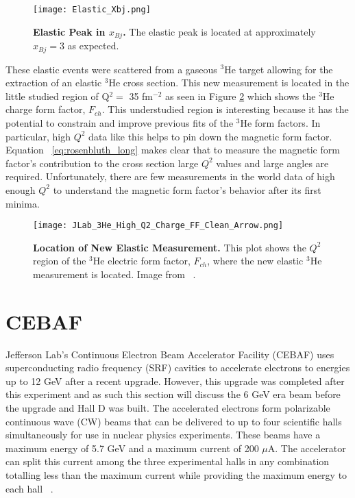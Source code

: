 \begin{figure}[!ht]
\begin{center}
\texttt{[image: Elastic\_Xbj.png]}
\end{center}
\caption[Elastic Peak in $x_{Bj}$]{
{\bf{Elastic Peak in $x_{Bj}$.}} The elastic peak is located at approximately $x_{Bj}=3$ as expected.}
\label{fig:elastic_xbj}
\end{figure}

These elastic events were scattered from a gaseous $^3$He target allowing for the extraction of an elastic $^3$He cross section. This new measurement is located in the little studied region of Q$^2 = $ 35 fm$^{-2}$ as seen in Figure \ref{fig:jlab_3he} which shows the $^3$He charge form factor, $F_{ch}$. This understudied region is interesting because it has the potential to constrain and improve previous fits of the $^3$He form factors. In particular, high $Q^2$ data like this helps to pin down the magnetic form factor. Equation ~\ref{eq:rosenbluth_long} makes clear that to measure the magnetic form factor's contribution to the cross section large $Q^2$ values and large angles are required. Unfortunately, there are few measurements in the world data of high enough $Q^2$ to understand the magnetic form factor's behavior after its first minima. 

\begin{figure}[!ht]
\begin{center}
\texttt{[image: JLab\_3He\_High\_Q2\_Charge\_FF\_Clean\_Arrow.png]}
\end{center}
\caption[Location of New Elastic Measurement]{
{\bf{Location of New Elastic Measurement.}} This plot shows the $Q^2$ region of the $^3$He electric form factor, $F_{ch}$, where the new elastic $^3$He measurement is located. Image from ~\cite{Article:Alex}.}
\label{fig:jlab_3he}
\end{figure}

\section{CEBAF}
\label{sec:CEBAF}

Jefferson Lab's Continuous Electron Beam Accelerator Facility (CEBAF) uses superconducting radio frequency (SRF) cavities to accelerate electrons to energies up to 12 GeV after a recent upgrade. However, this upgrade was completed after this experiment and as such this section will discuss the 6 GeV era beam before the upgrade and Hall D was built. The accelerated electrons form polarizable continuous wave (CW) beams that can be delivered to up to four scientific halls simultaneously for use in nuclear physics experiments. These beams have a maximum energy of 5.7 GeV and a maximum current of 200 $\mu$A. The accelerator can split this current among the three experimental halls in any combination totalling less than the maximum current while providing the maximum energy to each hall ~\cite{Article:CEBAF}.

